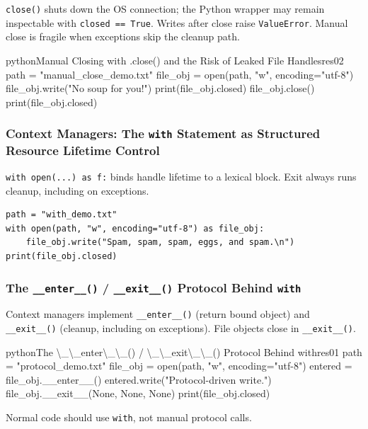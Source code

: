 \documentclass[a4paper,twoside]{report}
\begin{document}
\texttt{close()} shuts down the OS connection; the Python wrapper may remain inspectable with \texttt{closed == True}. Writes after close raise \texttt{ValueError}. Manual close is fragile when exceptions skip the cleanup path.

\begin{codebox}[]{python}{Manual Closing with .close() and the Risk of Leaked File Handles}{res02}
path = "manual_close_demo.txt"
file_obj = open(path, "w", encoding="utf-8")
file_obj.write("No soup for you!\n")
print(file_obj.closed)
file_obj.close()
print(file_obj.closed)
\end{codebox}


\subsubsection{Context Managers: The \texttt{with} Statement as Structured Resource Lifetime Control}

\texttt{with open(...) as f:} binds handle lifetime to a lexical block. Exit always runs cleanup, including on exceptions.

\begin{verbatim}
path = "with_demo.txt"
with open(path, "w", encoding="utf-8") as file_obj:
    file_obj.write("Spam, spam, spam, eggs, and spam.\n")
print(file_obj.closed)
\end{verbatim}

\subsubsection{The \texttt{\_\_enter\_\_()} / \texttt{\_\_exit\_\_()} Protocol Behind \texttt{with}}

Context managers implement \texttt{\_\_enter\_\_()} (return bound object) and \texttt{\_\_exit\_\_()} (cleanup, including on exceptions). File objects close in \texttt{\_\_exit\_\_()}.

\begin{codebox}[]{python}{The \textbackslash{}\_\textbackslash{}\_enter\textbackslash{}\_\textbackslash{}\_() / \textbackslash{}\_\textbackslash{}\_exit\textbackslash{}\_\textbackslash{}\_() Protocol Behind with}{res01}
path = "protocol_demo.txt"
file_obj = open(path, "w", encoding="utf-8")
entered = file_obj.__enter__()
entered.write("Protocol-driven write.\n")
file_obj.__exit__(None, None, None)
print(file_obj.closed)
\end{codebox}


Normal code should use \texttt{with}, not manual protocol calls.
\end{document}
